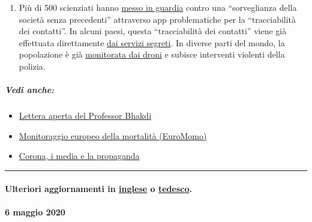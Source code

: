 \begin{enumerate}
{  parlato} di una ``epidemia dei media''.
\item
  Più di 500 scienziati hanno
  \href{https://www.esat.kuleuven.be/cosic/sites/contact-tracing-joint-statement/}{messo
  in guardia} contro una ``sorveglianza della società senza
  prece­denti'' attraverso app problematiche per la ``tracciabilità dei
  contatti''. In alcuni paesi, questa ``tracciabilità dei contatti''
  viene già effettuata direttamente
  \href{https://www.jewishpress.com/news/the-courts/state-to-high-court-even-more-shin-bet-involvement-in-fighting-the-coronavirus/2020/04/14/}{dai
  servizi segreti}. In diverse parti del mondo, la popolazione è già
  \href{https://off-guardian.org/2020/04/25/50-headlines-darker-more-of-the-new-normal/}{monitorata
  dai droni} e subisce interventi violenti della polizia.
\end{enumerate}

\hypertarget{vedi-anche}{%
\subparagraph{\texorpdfstring{\textbf{Vedi
anche:}}{Vedi anche:}}\label{vedi-anche}}

\begin{itemize}
\tightlist
\item
  \href{https://swprs.org/lettera-aperta-del-professor-sucharit-bhakdi-al-cancelliere-tedesco-dr-angela-merkel/}{Lettera
  aperta del Professor Bhakdi}
\item
  \href{https://www.euromomo.eu/}{Monitoraggio europeo della mortalità
  (EuroMomo)}
\item
  \href{https://swprs.org/corona-media-propaganda/}{Corona, i media e la
  propaganda}
\end{itemize}

\begin{center}\rule{0.5\linewidth}{\linethickness}\end{center}

\hypertarget{ulteriori-aggiornamenti-in-inglese-o-tedesco}{%
\paragraph{\texorpdfstring{Ulteriori aggiornamenti in
\href{https://swprs.org/a-swiss-doctor-on-covid-19/}{inglese} o
\href{https://swprs.org/covid-19-hinweis-ii/}{tedesco}.}{Ulteriori aggiornamenti in inglese o tedesco.}}\label{ulteriori-aggiornamenti-in-inglese-o-tedesco}}

\hypertarget{6-maggio-2020}{%
\paragraph{6 maggio 2020}\label{6-maggio-2020}}


